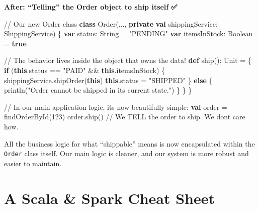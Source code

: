 \documentclass[
  letterpaper,
  DIV=11,
  numbers=noendperiod]{scrreprt}
\newenvironment{Shaded}{\begin{snugshade}}{\end{snugshade}}
\newcommand{\BuiltInTok}[1]{\textcolor[rgb]{0.00,0.23,0.31}{#1}}
\newcommand{\CommentTok}[1]{\textcolor[rgb]{0.37,0.37,0.37}{#1}}
\newcommand{\ControlFlowTok}[1]{\textcolor[rgb]{0.00,0.23,0.31}{\textbf{#1}}}
\newcommand{\DecValTok}[1]{\textcolor[rgb]{0.68,0.00,0.00}{#1}}
\newcommand{\ExtensionTok}[1]{\textcolor[rgb]{0.00,0.23,0.31}{#1}}
\newcommand{\FunctionTok}[1]{\textcolor[rgb]{0.28,0.35,0.67}{#1}}
\newcommand{\KeywordTok}[1]{\textcolor[rgb]{0.00,0.23,0.31}{\textbf{#1}}}
\newcommand{\NormalTok}[1]{\textcolor[rgb]{0.00,0.23,0.31}{#1}}
\newcommand{\OperatorTok}[1]{\textcolor[rgb]{0.37,0.37,0.37}{#1}}
\newcommand{\StringTok}[1]{\textcolor[rgb]{0.13,0.47,0.30}{#1}}
\begin{document}
\begin{itemize}
  \textbf{After: ``Telling'' the Order object to ship itself ✅}

\begin{Shaded}
\begin{Highlighting}[]
\CommentTok{// Our new Order class}
\KeywordTok{class} \FunctionTok{Order}\OperatorTok{(...,} \KeywordTok{private} \KeywordTok{val}\NormalTok{ shippingService}\OperatorTok{:}\NormalTok{ ShippingService}\OperatorTok{)} \OperatorTok{\{}
  \KeywordTok{var}\NormalTok{ status}\OperatorTok{:} \ExtensionTok{String} \OperatorTok{=} \StringTok{"PENDING"}
  \KeywordTok{var}\NormalTok{ itemsInStock}\OperatorTok{:} \ExtensionTok{Boolean} \OperatorTok{=} \KeywordTok{true}

  \CommentTok{// The behavior lives inside the object that owns the data!}
  \KeywordTok{def} \FunctionTok{ship}\OperatorTok{():} \BuiltInTok{Unit} \OperatorTok{=} \OperatorTok{\{}
    \ControlFlowTok{if} \OperatorTok{(}\KeywordTok{this}\OperatorTok{.}\NormalTok{status }\OperatorTok{==} \StringTok{"PAID"} \OperatorTok{\&\&} \KeywordTok{this}\OperatorTok{.}\NormalTok{itemsInStock}\OperatorTok{)} \OperatorTok{\{}
\NormalTok{      shippingService}\OperatorTok{.}\FunctionTok{shipOrder}\OperatorTok{(}\KeywordTok{this}\OperatorTok{)}
      \KeywordTok{this}\OperatorTok{.}\NormalTok{status }\OperatorTok{=} \StringTok{"SHIPPED"}
    \OperatorTok{\}} \ControlFlowTok{else} \OperatorTok{\{}
      \FunctionTok{println}\OperatorTok{(}\StringTok{"Order cannot be shipped in its current state."}\OperatorTok{)}
    \OperatorTok{\}}
  \OperatorTok{\}}
\OperatorTok{\}}

\CommentTok{// In our main application logic, it\textquotesingle{}s now beautifully simple:}
\KeywordTok{val}\NormalTok{ order }\OperatorTok{=} \FunctionTok{findOrderById}\OperatorTok{(}\DecValTok{123}\OperatorTok{)}
\NormalTok{order}\OperatorTok{.}\FunctionTok{ship}\OperatorTok{()} \CommentTok{// We TELL the order to ship. We don\textquotesingle{}t care how.}
\end{Highlighting}
\end{Shaded}

  All the business logic for what ``shippable'' means is now
  encapsulated within the \texttt{Order} class itself. Our main logic is
  cleaner, and our system is more robust and easier to maintain.
\end{itemize}


\chapter{A Scala \& Spark Cheat Sheet}\label{a-scala-spark-cheat-sheet}
\end{document}
